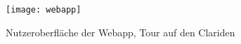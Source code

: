   \begin{figure}[H]
    \centering
    \texttt{[image: webapp]}
    \caption{Nutzeroberfläche der Webapp, Tour auf den Clariden}\label{fig:mainui}
  \end{figure}

\begin{multicols}{2}


\end{multicols}
